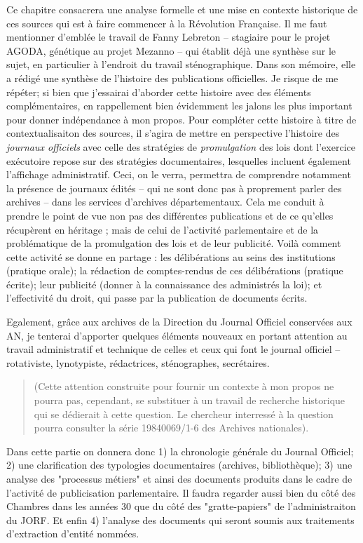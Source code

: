 Ce chapitre consacrera une analyse formelle et une mise en contexte historique de ces sources qui est à faire commencer à la Révolution Française. Il me faut mentionner d'emblée le travail de Fanny Lebreton -- stagiaire pour le projet AGODA, génétique au projet Mezanno -- qui établit déjà une synthèse sur le sujet, en particulier à l'endroit du travail sténographique. Dans son mémoire, elle a rédigé une synthèse de l'histoire des publications officielles. Je risque de me répéter; si bien que j'essairai d'aborder cette histoire avec des éléments complémentaires, en rappellement bien évidemment les jalons les plus important pour donner indépendance à mon propos. Pour compléter cette histoire à titre de contextualisaiton des sources, il s'agira de mettre en perspective l'histoire des \textit{journaux officiels} avec celle des stratégies de \textit{promulgation} des lois dont l'exercice exécutoire repose sur des stratégies documentaires, lesquelles incluent également l'affichage administratif. Ceci, on le verra, permettra de comprendre notamment la présence de journaux édités -- qui ne sont donc pas à proprement parler des archives -- dans les services d'archives départementaux. Cela me conduit à prendre le point de vue non pas des différentes publications et de ce qu'elles récupèrent en héritage ; mais de celui de l'activité parlementaire et de la problématique de la promulgation des lois et de leur publicité. Voilà comment cette activité se donne en partage : les délibérations au seins des institutions (pratique orale); la rédaction de comptes-rendus de ces délibérations (pratique écrite); leur publicité  (donner à la connaissance des administrés la loi); et l'effectivité du droit, qui passe par la publication de documents écrits.

Egalement, grâce aux archives de la Direction du Journal Officiel conservées aux AN, je tenterai d'apporter quelques éléments nouveaux en portant attention au travail administratif et technique de celles et ceux qui font le journal officiel -- rotativiste, lynotypiste, rédactrices, sténographes, secrétaires.

\begin{quote} (Cette attention construite pour fournir un contexte à mon propos ne pourra pas, cependant, se substituer à un travail de recherche historique qui se dédierait à cette question. Le chercheur interressé à la question pourra consulter la série 19840069/1-6 des Archives nationales).\end{quote}

Dans cette partie on donnera donc 1) la chronologie générale du Journal Officiel; 2) une clarification des typologies documentaires (archives, bibliothèque); 3) une analyse des "processus métiers" et ainsi des documents produits dans le cadre de l'activité de publicisation parlementaire. Il faudra regarder aussi bien du côté des Chambres dans les années 30 que du côté des "gratte-papiers" de l'administraiton du JORF. Et enfin 4) l'analyse des documents qui seront soumis aux traitements d'extraction d'entité nommées.

